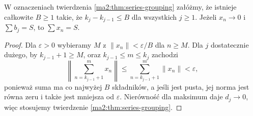 \begin{wniosek}
\label{ma2:cor:bounded-blocks}
W oznaczeniach twierdzenia \ref{ma2:thm:series-grouping}
załóżmy, że istnieje całkowite $B\ge1$ takie, że
$k_j-k_{j-1}\le B$ dla wszystkich $j\ge1$.
Jeżeli $x_n\to0$ i $\sum b_j=S$, to $\sum x_n=S$.
\end{wniosek}
\begin{proof}
Dla $\varepsilon>0$ wybieramy $M$ z
$\|x_n\|<\varepsilon/B$ dla $n\ge M$.
Dla $j$ dostatecznie dużego, by $k_{j-1}+1\ge M$,
oraz $k_{j-1}\le m\le k_j$ zachodzi
\[
 \left\|\sum_{n=k_{j-1}+1}^m x_n\right\|
 \le\sum_{n=k_{j-1}+1}^m\|x_n\|<\varepsilon,
\]
ponieważ suma ma co najwyżej $B$ składników, a jeśli jest
pusta, jej norma jest równa zeru i także jest mniejsza
od $\varepsilon$. Nierówność dla maksimum daje $d_j\to0$,
więc stosujemy twierdzenie \ref{ma2:thm:series-grouping}.
\end{proof}

